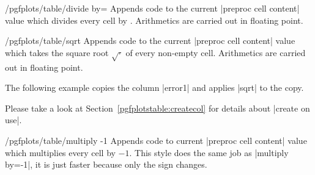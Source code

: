 \begin{stylekey}{/pgfplots/table/divide by=}
    Appends code to the current |preproc cell content| value which divides
    every cell by . Arithmetics are carried out in floating
    point.
\end{stylekey}

\begin{stylekey}{/pgfplots/table/sqrt}
    Appends code to the current |preproc cell content| value which takes the
    square root $\sqrt{\cdot}$ of every non-empty cell. Arithmetics are carried
    out in floating point.

    The following example copies the column |error1| and applies |sqrt| to the
    copy.
\begin{codeexample}[pre={\begin{lateximage}},post={\end{lateximage}}]
\end{codeexample}
    Please take a look at Section~\ref{pgfplotstable:createcol} for details
    about |create on use|.
\end{stylekey}

\begin{stylekey}{/pgfplots/table/multiply -1}
    Appends code to current |preproc cell content| value which multiplies every
    cell by $-1$. This style does the same job as |multiply by=-1|, it is just
    faster because only the sign changes.
\begin{codeexample}[pre={\begin{lateximage}},post={\end{lateximage}}]


\end{codeexample}
\end{stylekey}

